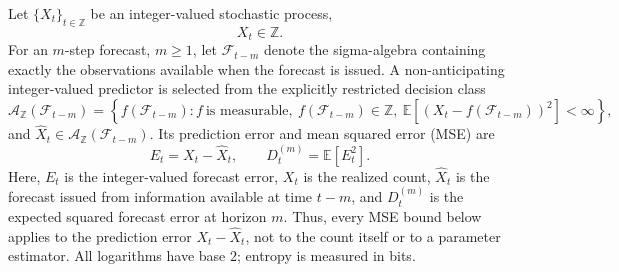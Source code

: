 \documentclass[applsci,article,accept,moreauthors]{Definitions/mdpi}
\def\hl#1{#1}%
\begin{document}
Let \(\{X_t\}_{t\in\mathbb{Z}}\) be an integer-valued stochastic \hl{process,} %
\begin{equation}
X_t\in\mathbb{Z}.
\label{eq:general_integer_process}
\end{equation}
\hl{For} %
 an \(m\)-step forecast, \(m\geq1\), let
\(\mathcal{F}_{t-m}\) denote the sigma-algebra containing exactly the
observations available when the forecast is issued. A non-anticipating
integer-valued predictor is selected from the explicitly restricted decision class
\begin{equation}
\mathcal A_{\mathbb Z}(\mathcal F_{t-m})
=
\left\{
f(\mathcal F_{t-m}):
f\ \text{is measurable},\
f(\mathcal F_{t-m})\in\mathbb Z,\
\mathbb E[(X_t-f(\mathcal F_{t-m}))^2]<\infty
\right\},
\label{eq:general_predictor}
\end{equation}
and \(\widehat X_t\in\mathcal A_{\mathbb Z}(\mathcal F_{t-m})\).
Its prediction error and mean squared error (MSE) are
\begin{equation}
E_t=X_t-\widehat X_t,
\qquad
D_t^{(m)}=\mathbb{E}[E_t^2].
\label{eq:general_error_mse}
\end{equation}
{\hl{Here}, \(E_t\) is the integer-valued forecast error, \(X_t\) is the
realized count, \(\widehat X_t\) is the forecast issued from information
available at time \(t-m\), and \(D_t^{(m)}\) is the expected squared forecast
error at horizon \(m\). Thus, every MSE bound below applies to the prediction
error \(X_t-\widehat X_t\), not to the count itself or to a parameter
estimator.}
All logarithms have base \(2\); entropy is measured in bits.
\end{document}
